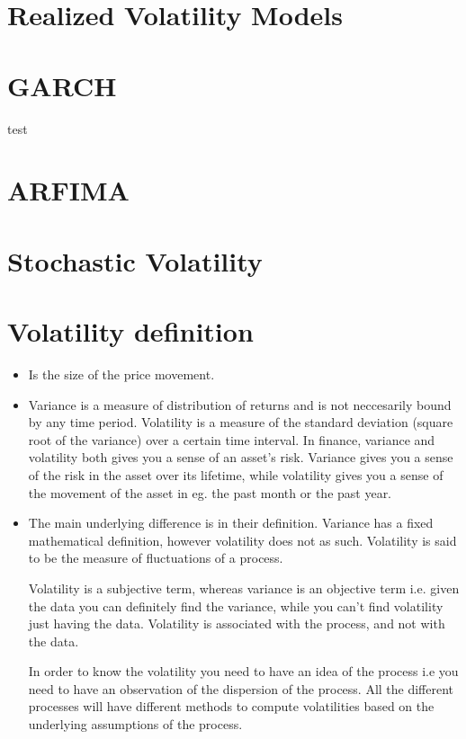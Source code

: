 

 
\section{Realized Volatility Models}

\section{GARCH}
test
\section{ARFIMA}
\section{Stochastic Volatility}

\section{Volatility definition}

\begin{itemize}

\item Is the size of the price movement.

\item Variance is a measure of distribution of returns and is not neccesarily bound by any time period.
Volatility is a measure of the standard deviation (square root of the variance) over a certain time interval. In finance, variance and volatility both gives you a sense of an asset's risk. Variance gives you a sense of the risk in the asset over its lifetime, while volatility gives you a sense of the movement of the asset in eg. the past month or the past year.


\item The main underlying difference is in their definition. Variance has a fixed mathematical definition, however volatility does not as such. Volatility is said to be the measure of fluctuations of a process.

Volatility is a subjective term, whereas variance is an objective term i.e. given the data you can definitely find the variance, while you can't find volatility just having the data. Volatility is associated with the process, and not with the data.

In order to know the volatility you need to have an idea of the process i.e you need to have an observation of the dispersion of the process. All the different processes will have different methods to compute volatilities based on the underlying assumptions of the process.
\end{itemize}



